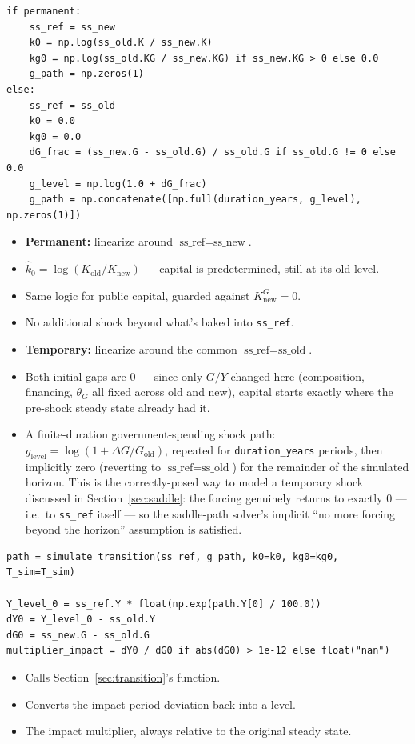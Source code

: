 \documentclass[11pt]{article}
\begin{document}
\begin{lstlisting}[firstnumber=449]
if permanent:
    ss_ref = ss_new
    k0 = np.log(ss_old.K / ss_new.K)
    kg0 = np.log(ss_old.KG / ss_new.KG) if ss_new.KG > 0 else 0.0
    g_path = np.zeros(1)
else:
    ss_ref = ss_old
    k0 = 0.0
    kg0 = 0.0
    dG_frac = (ss_new.G - ss_old.G) / ss_old.G if ss_old.G != 0 else 0.0
    g_level = np.log(1.0 + dG_frac)
    g_path = np.concatenate([np.full(duration_years, g_level), np.zeros(1)])
\end{lstlisting}
\begin{itemize}
\item[\textbf{L449}] \textbf{Permanent:} linearize around $\text{ss\_ref}=\text{ss\_new}$.
\item[\textbf{L450}] $\hat k_0=\log(K_{\text{old}}/K_{\text{new}})$ ---
capital is predetermined, still at its old level.
\item[\textbf{L451}] Same logic for public capital, guarded against
$K^G_{\text{new}}=0$.
\item[\textbf{L452}] No additional shock beyond what's baked into
\texttt{ss\_ref}.
\item[\textbf{L454}] \textbf{Temporary:} linearize around the common
$\text{ss\_ref}=\text{ss\_old}$.
\item[\textbf{L455--L456}] Both initial gaps are $0$ --- since only $G/Y$
changed here (composition, financing, $\theta_G$ all fixed across old and
new), capital starts exactly where the pre-shock steady state already had
it.
\item[\textbf{L457--L460}] A finite-duration government-spending shock
path: $g_{\text{level}}=\log(1+\Delta G/G_{\text{old}})$, repeated for
\texttt{duration\_years} periods, then implicitly zero (reverting to
$\text{ss\_ref}=\text{ss\_old}$) for the remainder of the simulated horizon.
This is the correctly-posed way to model a temporary shock discussed in
Section~\ref{sec:saddle}: the forcing genuinely returns to exactly $0$ ---
i.e.\ to \texttt{ss\_ref} itself --- so the saddle-path solver's implicit
``no more forcing beyond the horizon'' assumption is satisfied.
\end{itemize}

\begin{lstlisting}[firstnumber=462]
path = simulate_transition(ss_ref, g_path, k0=k0, kg0=kg0, T_sim=T_sim)

Y_level_0 = ss_ref.Y * float(np.exp(path.Y[0] / 100.0))
dY0 = Y_level_0 - ss_old.Y
dG0 = ss_new.G - ss_old.G
multiplier_impact = dY0 / dG0 if abs(dG0) > 1e-12 else float("nan")
\end{lstlisting}
\begin{itemize}
\item[\textbf{L462}] Calls Section~\ref{sec:transition}'s function.
\item[\textbf{L464}] Converts the impact-period deviation back into a
level.
\item[\textbf{L465--L467}] The impact multiplier, always relative to the
original steady state.
\end{itemize}
\end{document}

